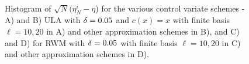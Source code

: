 \begin{figure}[htbp]
	\centering
	\mbox{
  }
 \mbox{
 } 
	\caption{Histogram of $\sqrt{N}(\eta_N^{i} - \eta$) for the various control variate schemes -  A) and B) ULA with $\delta =0.05$ and $c(x) = x$ with finite basis $\ell = 10,20$ in A) and other approximation schemes in B), and C) and D) for RWM with $\delta = 0.05$ with finite basis $\ell = 10,20$ in C) and other approximation schemes in D).}
	\label{fig:mcmc_ula_rwm_hist}
\end{figure}

